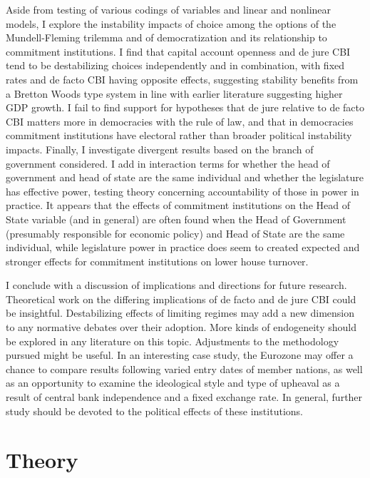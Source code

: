 \documentclass{article}
\begin{document}
    Aside from testing of various codings of variables and linear and nonlinear models, I explore the instability impacts of choice among the options of the Mundell-Fleming trilemma and of democratization and its relationship to commitment institutions. I find that capital account openness and de jure CBI tend to be destabilizing choices independently and in combination, with fixed rates and de facto CBI having opposite effects, suggesting stability benefits from a Bretton Woods type system in line with earlier literature suggesting higher GDP growth. I fail to find support for hypotheses that de jure relative to de facto CBI matters more in democracies with the rule of law, and that in democracies commitment institutions have electoral rather than broader political instability impacts. Finally, I investigate divergent results based on the branch of government considered. I add in interaction terms for whether the head of government and head of state are the same individual and whether the legislature has effective power, testing theory concerning accountability of those in power in practice. It appears that the effects of commitment institutions on the Head of State variable (and in general) are often found when the Head of Government (presumably responsible for economic policy) and Head of State are the same individual, while legislature power in practice does seem to created expected and stronger effects for commitment institutions on lower house turnover.

    I conclude with a discussion of implications and directions for future research. Theoretical work on the differing implications of de facto and de jure CBI could be insightful. Destabilizing effects of limiting regimes may add a new dimension to any normative debates over their adoption. More kinds of endogeneity should be explored in any literature on this topic. Adjustments to the methodology pursued might be useful. In an interesting case study, the Eurozone may offer a chance to compare results following varied entry dates of member nations, as well as an opportunity to examine the ideological style and type of upheaval as a result of central bank independence and a fixed exchange rate. In general, further study should be devoted to the political effects of these institutions.
    
    \section*{Theory}
\end{document}
